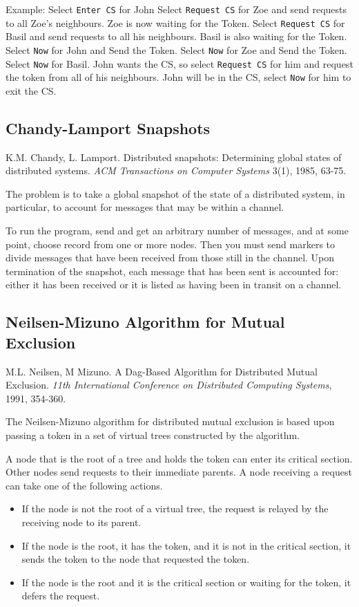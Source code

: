 \documentclass[11pt]{article}
\newcommand{\p}[1]{\texttt{#1}}
\begin{document}
Example:
Select \p{Enter CS} for John
Select \p{Request CS} for Zoe and send requests to all Zoe's neighbours.
Zoe is now waiting for the Token.
Select \p{Request CS} for Basil and send requests to all his neighbours.
Basil is also waiting for the Token.
Select \p{Now} for John and Send the Token.
Select \p{Now} for Zoe and Send the Token.
Select \p{Now} for Basil.
John wants the CS, so select \p{Request CS} for him and request the token
from all of his neighbours.
John will be in the CS, select \p{Now} for him to exit the CS.

\subsection{Chandy-Lamport Snapshots}

K.M. Chandy, L. Lamport.
Distributed snapshots: Determining global
states of distributed systems.
\emph{ACM Transactions on Computer Systems} 3(1), 1985, 63-75.

The problem is to take a global snapshot of the state of a
distributed system, in particular, to account for messages that
may be within a channel.

To run the program, send and get an arbitrary number of messages,
and at some point, choose record from one or more nodes. Then
you must send markers to divide messages that have been received
from those still in the channel. Upon termination of the
snapshot, each message that has been sent is accounted for:
either it has been received or it is listed as having been in
transit on a channel.

\subsection{Neilsen-Mizuno Algorithm for Mutual Exclusion}
M.L. Neilsen, M Mizuno.
A Dag-Based Algorithm for Distributed Mutual Exclusion.
\emph{11th International Conference on Distributed Computing Systems}, 1991, 354-360.

The Neilsen-Mizuno algorithm for distributed mutual exclusion is based
upon passing a token in a set of virtual trees constructed by the
algorithm.

A node that is the root of a tree and holds the token can enter its
critical section. Other nodes send requests to their immediate
parents. A node receiving a request can take one of the following actions.

\begin{itemize}
\item If the node is not the root of a virtual tree, the request is
relayed by the receiving node to its parent.
\item If the node is the root, it has the token, and it is not in the
critical section, it sends the token to the node that requested the
token.
\item If the node is the root and it is the critical section or
waiting for the token, it defers the request.
\end{itemize}
\end{document}
